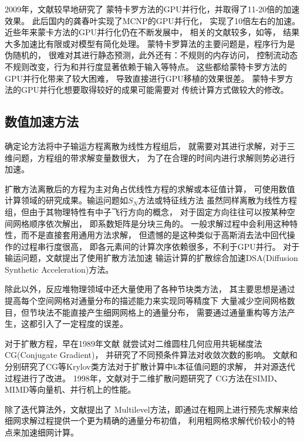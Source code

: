 2009年，文献较早地研究了
蒙特卡罗方法的GPU并行化，并取得了11-20倍的加速效果。
此后国内的龚春叶实现了MCNP的GPU并行化\cite{gongyechun}，
实现了10倍左右的加速。
近些年来蒙卡方法的GPU并行化仍在不断发展中，
相关的文献较多，如等，
结果大多加速比有限或对模型有简化处理。
蒙特卡罗算法的主要问题是，程序行为是伪随机的，
很难对其进行静态预测，此外还有：不规则的内存访问，
控制流动态不规则改变，行为和并行度显著依赖于输入等特点。
这些都给蒙特卡罗方法的GPU并行化带来了较大困难，
导致直接进行GPU移植的效果很差。\cite{Martin2013}
蒙特卡罗方法的GPU并行化想要取得较好的成果可能需要对
传统计算方式做较大的修改。\cite{lichenglong}

\subsection{数值加速方法}

确定论方法将中子输运方程离散为线性方程组后，
就需要对其进行求解，对于三维问题，方程组的带求解变量数很大，
为了在合理的时间内进行求解则势必进行加速。

扩散方法离散后的方程为主对角占优线性方程的求解或本征值计算，
可使用数值计算领域的研究成果。输运问题如$S_N$方法或特征线方法
虽然同样离散为线性方程组，但由于其物理特性有中子飞行方向的概念，
对于固定方向往往可以按某种空间网格顺序依次解出，
即系数矩阵是分块三角的。
一般求解过程中会利用这种特性，而不是直接套用通用方法求解，
但遗憾的是这种类似于高斯消去法中回代操作的过程串行度很高，
即各元素间的计算次序依赖很多，不利于GPU并行。
对于输运问题，文献提出了使用扩散方法加速
输运计算的扩散综合加速DSA(Diffusion Synthetic Acceleration)方法。

除此以外，反应堆物理领域中还大量使用了各种节块类方法，
其主要思想是通过提高每个空间网格对通量分布的描述能力来实现同等精度下
大量减少空间网格数目，但节块法不能直接产生细网网格上的通量分布，
需要通过通量重构等方法产生，这都引入了一定程度的误差。

对于扩散方程，早在1989年文献
就尝试对二维圆柱几何应用共轭梯度法CG(Conjugate Gradient)，
并研究了不同预条件算法对收敛次数的影响。
文献和
分别研究了CG等Krylov类方法对于扩散计算中k本征值问题的求解，
并对源迭代过程进行了改进。
1998年，文献对于二维扩散问题研究了
CG方法在SIMD、MIMD等向量机、并行机上的性能。

除了迭代算法外，文献提出了
Multilevel方法，即通过在粗网上进行预先求解来给细网求解过程提供一个更为精确的通量分布初值，
利用粗网格求解代价较小的特点来加速细网计算。

